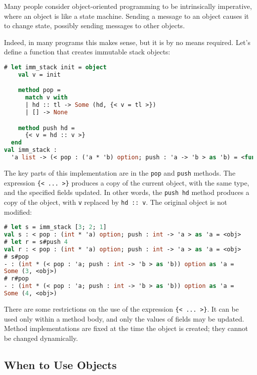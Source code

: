 Many people consider object-oriented programming to be intrinsically
imperative, where an object is like a state machine. Sending a message
to an object causes it to change state, possibly sending messages to
other objects. 

Indeed, in many programs this makes sense, but it is by no means
required. Let's define a function that creates immutable stack objects:

\begin{lstlisting}[language=Caml]
# let imm_stack init = object
    val v = init

    method pop =
      match v with
      | hd :: tl -> Some (hd, {< v = tl >})
      | [] -> None

    method push hd =
      {< v = hd :: v >}
  end
val imm_stack :
  'a list -> (< pop : ('a * 'b) option; push : 'a -> 'b > as 'b) = <fun>
\end{lstlisting}

The key parts of this implementation are in the
\passthrough{\lstinline!pop!} and \passthrough{\lstinline!push!}
methods. The expression \passthrough{\lstinline!\{< ... >\}!} produces a
copy of the current object, with the same type, and the specified fields
updated. In other words, the \passthrough{\lstinline!push hd!} method
produces a copy of the object, with \passthrough{\lstinline!v!} replaced
by \passthrough{\lstinline!hd :: v!}. The original object is not
modified:

\begin{lstlisting}[language=Caml]
# let s = imm_stack [3; 2; 1]
val s : < pop : (int * 'a) option; push : int -> 'a > as 'a = <obj>
# let r = s#push 4
val r : < pop : (int * 'a) option; push : int -> 'a > as 'a = <obj>
# s#pop
- : (int * (< pop : 'a; push : int -> 'b > as 'b)) option as 'a =
Some (3, <obj>)
# r#pop
- : (int * (< pop : 'a; push : int -> 'b > as 'b)) option as 'a =
Some (4, <obj>)
\end{lstlisting}

There are some restrictions on the use of the expression
\passthrough{\lstinline!\{< ... >\}!}. It can be used only within a
method body, and only the values of fields may be updated. Method
implementations are fixed at the time the object is created; they cannot
be changed {dynamically}.

\hypertarget{when-to-use-objects}{%
\subsection{When to Use Objects}\label{when-to-use-objects}}


